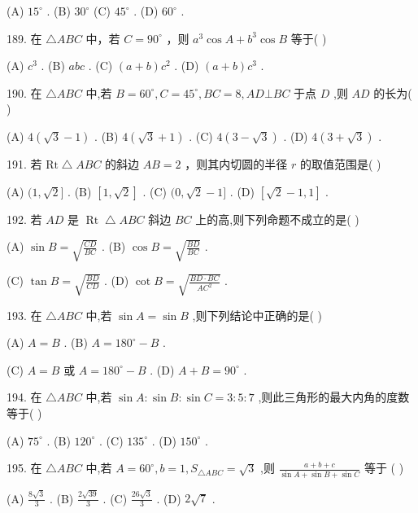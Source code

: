 \documentclass[10pt]{article}
\begin{document}
(A) \({15}^{ \circ  }\) . (B) \({30}^{ \circ  }\) (C) \({45}^{ \circ  }\) . (D) \({60}^{ \circ  }\) .

189. 在 \(\bigtriangleup  {ABC}\) 中，若 \(C = {90}^{ \circ  }\) ，则 \({a}^{3}\cos A + {b}^{3}\cos B\) 等于( )

(A) \({c}^{3}\) . (B) \({abc}\) . (C) \(\left( {a + b}\right) {c}^{2}\) . (D) \(\left( {a + b}\right) {c}^{3}\) .

190. 在 \(\bigtriangleup {ABC}\) 中,若 \(B = {60}^{ \circ  },C = {45}^{ \circ  },{BC} = 8,{AD} \bot  {BC}\) 于点 \(D\) ,则 \({AD}\) 的长为( )

(A) \(4\left( {\sqrt{3} - 1}\right)\) . (B) \(4\left( {\sqrt{3} + 1}\right)\) . (C) \(4\left( {3 - \sqrt{3}}\right)\) . (D) \(4\left( {3 + \sqrt{3}}\right)\) .

191. 若 \(\mathrm{{Rt}}\bigtriangleup {ABC}\) 的斜边 \({AB} = 2\) ，则其内切圆的半径 \(r\) 的取值范围是( )

(A) \((1,\sqrt{2}\rbrack\) . (B) \(\left\lbrack  {1,\sqrt{2}}\right\rbrack\) . (C) \((0,\sqrt{2} - 1\rbrack\) . (D) \(\left\lbrack  {\sqrt{2} - 1,1}\right\rbrack\) .

192. 若 \({AD}\) 是 \(\operatorname{Rt}\bigtriangleup {ABC}\) 斜边 \({BC}\) 上的高,则下列命题不成立的是( )

(A) \(\sin B = \sqrt{\frac{CD}{BC}}\) . (B) \(\cos B = \sqrt{\frac{BD}{BC}}\) .

(C) \(\tan B = \sqrt{\frac{BD}{CD}}\) . (D) \(\cot B = \sqrt{\frac{{BD} \cdot  {BC}}{A{C}^{2}}}\) .

193. 在 \(\bigtriangleup {ABC}\) 中,若 \(\sin A = \sin B\) ,则下列结论中正确的是( )

(A) \(A = B\) . (B) \(A = {180}^{ \circ  } - B\) .

(C) \(A = B\) 或 \(A = {180}^{ \circ  } - B\) . (D) \(A + B = {90}^{ \circ  }\) .

194. 在 \(\bigtriangleup {ABC}\) 中,若 \(\sin A : \sin B : \sin C = 3 : 5 : 7\) ,则此三角形的最大内角的度数等于( )

(A) \({75}^{ \circ  }\) . (B) \({120}^{ \circ  }\) . (C) \({135}^{ \circ  }\) . (D) \({150}^{ \circ  }\) .

195. 在 \(\bigtriangleup {ABC}\) 中,若 \(A = {60}^{ \circ  },b = 1,{S}_{\bigtriangleup {ABC}} = \sqrt{3}\) ,则 \(\frac{a + b + c}{\sin A + \sin B + \sin C}\) 等于 ( )

(A) \(\frac{8\sqrt{3}}{3}\) . (B) \(\frac{2\sqrt{39}}{3}\) . (C) \(\frac{{26}\sqrt{3}}{3}\) . (D) \(2\sqrt{7}\) .
\end{document}
